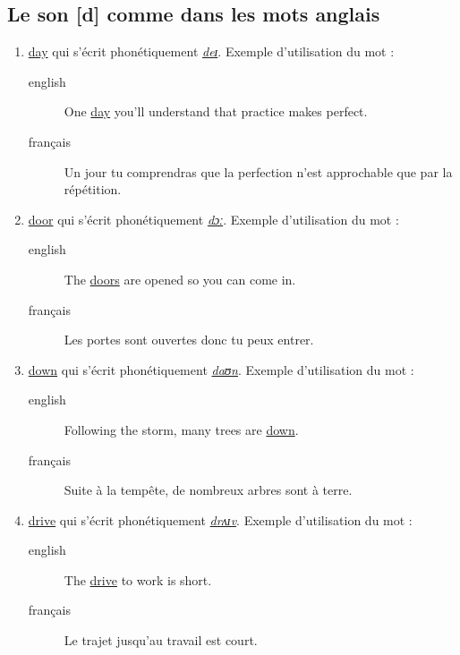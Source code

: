 \documentclass[12pt,a4paper]{book}
\begin{document}
\subsection{Le son [d] comme dans les mots anglais}
\label{sec:org6c913ef}
\begin{enumerate}
\item \href{http://www.wordreference.com/enfr/day}{day} qui s'écrit phonétiquement \href{https://en.oxforddictionaries.com/definition/day}{\emph{deɪ}}. Exemple d'utilisation du mot :
\begin{description}
\item[{english}] \textenglish{One \href{https://youtu.be/sl9voSKJmEU}{day} you'll understand that practice makes perfect.}
\item[{français}] Un jour tu comprendras que la perfection n'est
approchable que par la répétition.
\end{description}
\item \href{http://www.wordreference.com/enfr/door}{door} qui s'écrit phonétiquement \href{https://en.oxforddictionaries.com/definition/door}{\emph{dɔː}}. Exemple d'utilisation du mot :
\begin{description}
\item[{english}] \textenglish{The \href{https://youtu.be/eDW\_yAwaHnc}{doors} are opened so you can come in.}
\item[{français}] Les portes sont ouvertes donc tu peux entrer.
\end{description}
\item \href{http://www.wordreference.com/enfr/down}{down} qui s'écrit phonétiquement \href{https://en.oxforddictionaries.com/definition/down}{\emph{daʊn}}. Exemple d'utilisation du mot :
\begin{description}
\item[{english}] \textenglish{Following the storm, many trees are \href{https://youtu.be/pn4oaQNiNQc}{down}.}
\item[{français}] Suite à la tempête, de nombreux arbres sont à terre.
\end{description}
\item \href{http://www.wordreference.com/enfr/drive}{drive} qui s'écrit phonétiquement \href{https://en.oxforddictionaries.com/definition/drive}{\emph{drʌɪv}}. Exemple d'utilisation du mot :
\begin{description}
\item[{english}] \textenglish{The \href{https://youtu.be/mPBCO17bFms}{drive} to work is short.}
\item[{français}] Le trajet jusqu'au travail est court.
\end{description}
\end{enumerate}
\end{document}
